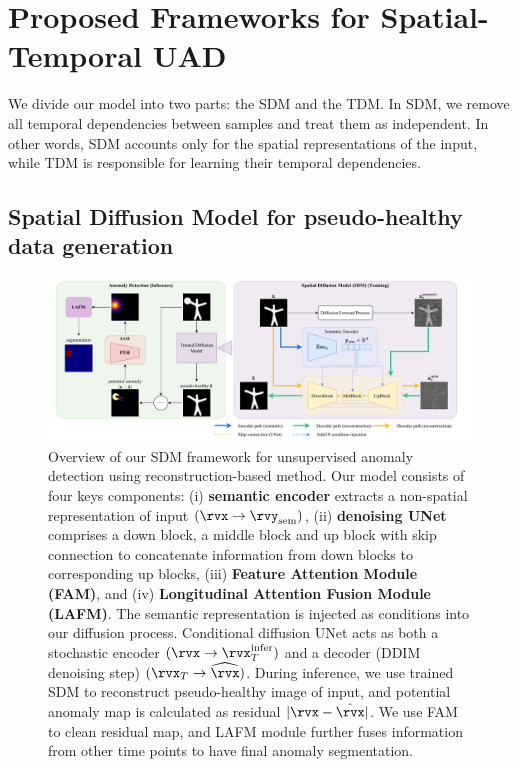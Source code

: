 \section{Proposed Frameworks for Spatial-Temporal UAD}
\label{sec:method}

We divide our model into two parts: the \ac{SDM} and the \ac{TDM}. In \ac{SDM}, we remove all temporal dependencies between samples and treat them as independent. In other words, \ac{SDM} accounts only for the spatial representations of the input, while \ac{TDM} is responsible for learning their temporal dependencies.

\subsection{Spatial Diffusion Model for pseudo-healthy data generation}

\begin{figure}[htbp]
    \centering
    \includegraphics[width=1\linewidth]{figures/model-sdm.pdf}
    \caption{Overview of our \ac{SDM} framework for unsupervised anomaly detection using reconstruction-based method. Our model consists of four keys components: (i) \textbf{semantic encoder} extracts a non-spatial representation of input $(\rvx \to \rvy_{\text{sem}})$, (ii) \textbf{denoising UNet} comprises a down block, a middle block and up block with skip connection to concatenate information from down blocks to corresponding up blocks, (iii) \textbf{Feature Attention Module (FAM)}, and (iv) \textbf{Longitudinal Attention Fusion Module (LAFM)}. The semantic representation is injected as conditions into our diffusion process. Conditional diffusion UNet acts as both a stochastic encoder $(\rvx \to \rvx_T^{\text{infer}})$ and a decoder (DDIM denoising step) $(\rvx_T \to \widehat{\rvx})$. During inference, we use trained SDM to reconstruct pseudo-healthy image of input, and potential anomaly map is calculated as residual $|\rvx - \hat{\rvx}|$. We use \ac{FAM} to clean residual map, and \ac{LAFM} module further fuses information from other time points to have final anomaly segmentation.} 
    \label{fig:model-sdm}
\end{figure}

